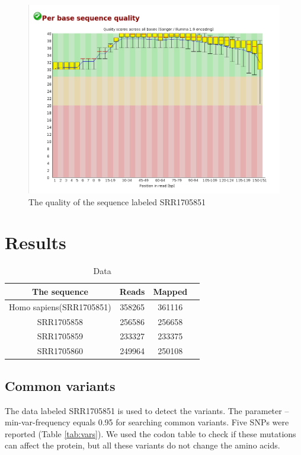 \documentclass{article}
\begin{document}
\begin{figure}[h]
\centering
\includegraphics[scale=0.35]{data_q.png} 
 
\caption{ The quality of the sequence labeled SRR1705851  }
\label{saw}
\end{figure}

\section{Results}

	\begin{table} 
	\centering
	\begin{tabular}{|c|c|c|c|}
		\hline
		The sequence & Reads & Mapped \\
		\hline
		Homo sapiens(SRR1705851) & 358265 & 361116\\
		\hline
		SRR1705858 & 256586 & 256658 \\
		\hline
		SRR1705859 & 233327 & 233375\\
		\hline
		SRR1705860 & 249964  & 250108\\
		\hline
	\end{tabular}
\caption{Data}
\end{table}
 
\subsection{Common variants}
The  data labeled SRR1705851 is used to detect the variants.  The parameter --min-var-frequency equals 0.95 for searching common variants. Five SNPs were reported (Table \ref{tab:vars}). We used the codon table to check if these mutations can affect the protein, but all these variants do not change the amino acids. 
\end{document}
